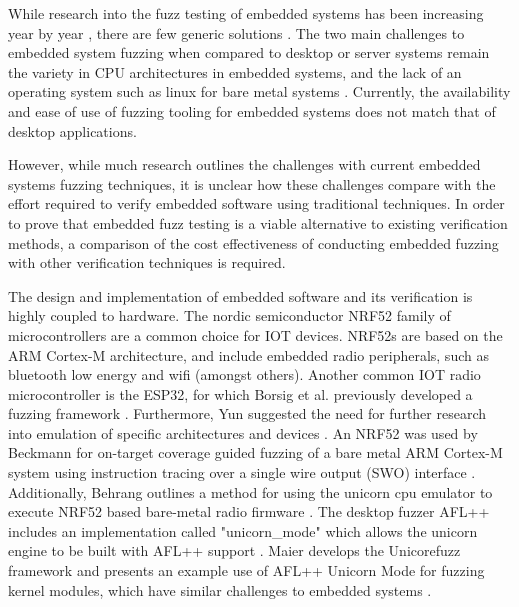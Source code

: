 \documentclass[11pt]{article}
\begin{document}
While research into the fuzz testing of embedded systems has been increasing
year by year \citep{Yun_2022}, there are few generic solutions
\citep{Eisele_et_al_2022}. The two main challenges to embedded system fuzzing
when compared to desktop or server systems remain the variety in CPU
architectures in embedded systems, and the lack of an operating system such as
linux for bare metal systems \citep{Eisele_et_al_2022}. Currently, the
availability and ease of use of fuzzing tooling for embedded systems does not
match that of desktop applications.





However, while much research outlines the
challenges with current embedded systems fuzzing techniques, it is unclear how
these challenges compare with the effort required to verify embedded software
using traditional techniques. In order to prove that embedded fuzz testing is a
viable alternative to existing verification methods, a comparison of the cost
effectiveness of conducting embedded fuzzing with other verification techniques
is required.

The design and implementation of embedded software and its verification is
highly coupled to hardware. The nordic semiconductor NRF52 family of
microcontrollers are a common choice for IOT devices. NRF52s are based on the
ARM Cortex-M architecture, and include embedded radio peripherals, such as
bluetooth low energy and wifi (amongst others). Another common IOT radio
microcontroller is the ESP32, for which Borsig et al. previously developed a
fuzzing framework \citep{Borsig_2020}. Furthermore, Yun suggested the need for
further research into emulation of specific architectures and devices
\citep{Yun_2022}. An NRF52 was used by Beckmann for on-target coverage guided
fuzzing of a bare metal ARM Cortex-M system using instruction tracing over a
single wire output (SWO) interface \citep{Beckmann_2023}. Additionally, Behrang
outlines a method for using the unicorn cpu emulator to execute NRF52 based
bare-metal radio firmware \citep{Behrang_2023}. The desktop fuzzer AFL++
includes an implementation called "unicorn\_mode" which allows the unicorn
engine to be built with AFL++ support \citep{UnicornMode}. Maier develops the
Unicorefuzz framework and presents an example use of AFL++ Unicorn Mode for
fuzzing kernel modules, which have similar challenges to embedded systems
\citep{Maier_2019}.
\end{document}
